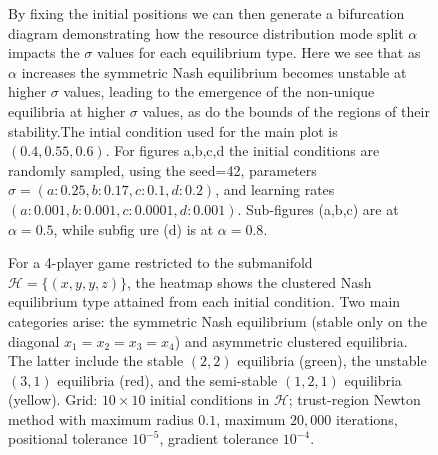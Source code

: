 \documentclass{article}
\begin{document}
                    \begin{figure}[ht!]
                        \centering
                        
                        \caption{By fixing the initial positions we can then generate a bifurcation diagram demonstrating how the resource distribution mode split $\alpha$ impacts the $\sigma$ values for each equilibrium type. Here we see that as $\alpha$ increases the symmetric Nash equilibrium becomes unstable at higher $\sigma$ values, leading to the emergence of the non-unique equilibria at higher $\sigma$ values, as do the bounds of the regions of their stability.The intial condition used for the main plot is $(0.4,0.55,0.6)$. For figures a,b,c,d the initial conditions are randomly sampled, using the seed=42, parameters $\sigma =(a:0.25,b:0.17,c:0.1,d:0.2)$, and learning rates $(a:0.001,b:0.001,c:0.0001,d:0.001)$. Sub-figures (a,b,c) are at $\alpha=0.5$, while subfig  ure (d) is at $\alpha=0.8$.}
                        \label{fig:4player_bifurcation}
                    \end{figure}
                    \begin{figure}[ht!]
                        
                        \caption{For a 4-player game restricted to the submanifold $\mathcal{H} = \{(x,y,y,z)\}$, the heatmap shows the clustered Nash equilibrium type attained from each initial condition. Two main categories arise: the symmetric Nash equilibrium (stable only on the diagonal $x_1=x_2=x_3=x_4$) and asymmetric clustered equilibria. The latter include the stable $(2,2)$ equilibria (green), the unstable $(3,1)$ equilibria (red), and the semi-stable $(1,2,1)$ equilibria (yellow). Grid: $10\times 10$ initial conditions in $\mathcal{H}$; trust-region Newton method \cite{conn2000trust} with maximum radius $0.1$, maximum $20{,}000$ iterations, positional tolerance $10^{-5}$, gradient tolerance $10^{-4}$.}
                        \label{fig:4player_heatmap}
                    \end{figure}
                
                \clearpage
                
\end{document}
